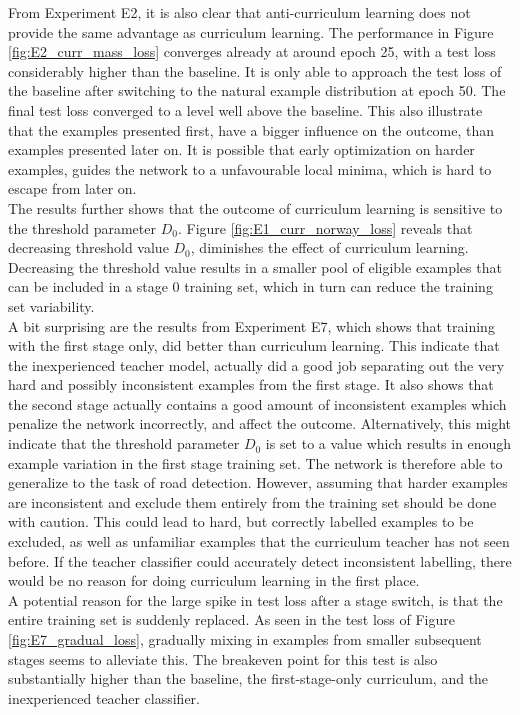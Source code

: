 From Experiment E2, it is also clear that anti-curriculum learning does not provide the same advantage as curriculum learning. The performance in Figure \ref{fig:E2_curr_mass_loss} converges already at around epoch 25, with a test loss considerably higher than the baseline. It is only able to approach the test loss of the baseline after switching to the natural example distribution at epoch 50. The final test loss converged to a level well above the baseline. This also illustrate that the examples presented first, have a bigger influence on the outcome, than examples presented later on. It is possible that early optimization on harder examples, guides the network to a unfavourable local minima, which is hard to escape from later on.\\

The results further shows that the outcome of curriculum learning is sensitive to the threshold parameter $D_0$. Figure \ref{fig:E1_curr_norway_loss} reveals that decreasing threshold value $D_0$, diminishes the effect of curriculum learning. Decreasing the threshold value results in a smaller pool of eligible examples that can be included in a stage 0 training set, which in turn can reduce the training set variability.\\ 

A bit surprising are the results from Experiment E7, which shows that training with the first stage only, did better than curriculum learning. This indicate that the inexperienced teacher model, actually did a good job separating out the very hard and possibly inconsistent examples from the first stage. It also shows that the second stage actually contains a good amount of inconsistent examples which penalize the network incorrectly, and affect the outcome. Alternatively, this might indicate that the threshold parameter $D_0$ is set to a value which results in enough example variation in the first stage training set. The network is therefore able to generalize to the task of road detection. However, assuming that harder examples are inconsistent and exclude them entirely from the training set should be done with caution. This could lead to hard, but correctly labelled examples to be excluded, as well as unfamiliar examples that the curriculum teacher has not seen before. If the teacher classifier could accurately detect inconsistent labelling, there would be no reason for doing curriculum learning in the first place.\\ 

A potential reason for the large spike in test loss after a stage switch, is that the entire training set is suddenly replaced. As seen in the test loss of Figure \ref{fig:E7_gradual_loss}, gradually mixing in examples from smaller subsequent stages seems to alleviate this. The breakeven point for this test is also substantially higher than the baseline, the first-stage-only curriculum, and the inexperienced teacher classifier.\\

